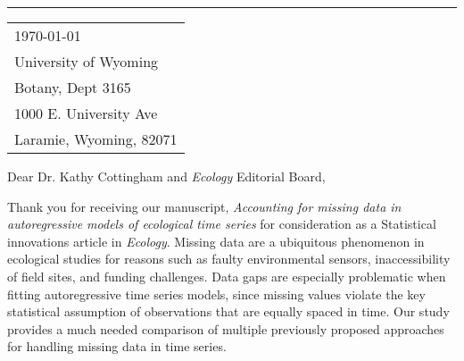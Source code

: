 \documentclass{article}
\begin{document}


\vspace{-1em} %

\rule{\linewidth}{1pt} %

\bigskip %


\hfill
\begin{tabular}{l @{}}
	\today \bigskip\\ %
	University of Wyoming\\
	Botany, Dept 3165\\
    1000 E. University Ave\\
    Laramie, Wyoming, 82071\\
\end{tabular}

\bigskip %



\bigskip %

Dear Dr. Kathy Cottingham and \textit{Ecology} Editorial Board,

\bigskip %



Thank you for receiving our manuscript, \textit{Accounting for missing data in autoregressive models of ecological time series} for consideration as a Statistical innovations article in \textit{Ecology}. Missing data are a ubiquitous phenomenon in ecological studies for reasons such as faulty environmental sensors, inaccessibility of field sites, and funding challenges. Data gaps are especially problematic when fitting autoregressive time series models, since missing values violate the key statistical assumption of observations that are equally spaced in time. Our study provides a much needed comparison of multiple previously proposed approaches for handling missing data in time series. 
\end{document}
